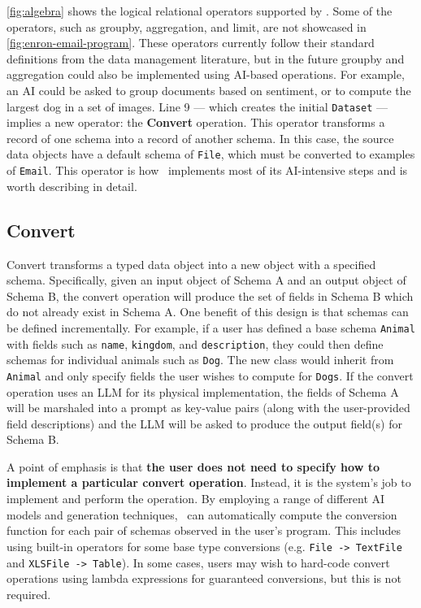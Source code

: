 \autoref{fig:algebra} shows the logical relational operators supported by \system{}.  Some of the operators, such as groupby, aggregation, and limit, are not showcased in \autoref{fig:enron-email-program}. These operators currently follow their standard definitions from the data management literature, but in the future groupby and aggregation could also be implemented using AI-based operations. For example, an AI could be asked to group documents based on sentiment, or to compute the largest dog in a set of images. Line 9 --- which creates the initial {\tt Dataset} --- implies a new operator: the \textbf{Convert} operation. This operator transforms a record of one schema into a record of another schema. In this case, the source data objects have a default schema of {\tt File}, which must be converted to examples of {\tt Email}. This operator is how \system\ implements most of its AI-intensive steps and is worth describing in detail.

\subsection{Convert}
\label{sec:convert}
Convert transforms a typed data object into a new object with a specified schema. Specifically, given an input object of Schema A and an output object of Schema B, the convert operation will produce the set of fields in Schema B which do not already exist in Schema A. One benefit of this design is that schemas can be defined incrementally. For example, if a user has defined a base schema \texttt{Animal} with fields such as \texttt{name}, \texttt{kingdom}, and \texttt{description}, they could then define schemas for individual animals such as \texttt{Dog}. The new class would inherit from \texttt{Animal} and only specify fields the user wishes to compute for \texttt{Dogs}. If the convert operation uses an LLM for its physical implementation, the fields of Schema A will be marshaled into a prompt as key-value pairs (along with the user-provided field descriptions) and the LLM will be asked to produce the output field(s) for Schema B.


A point of emphasis is that {\bf the user does not need to specify how to implement a particular convert operation}.  Instead, it is the system's job to implement and perform the operation. By employing a range of different AI models and generation techniques, \system\ can automatically compute the conversion function for each pair of schemas observed in the user's program. This includes using built-in operators for some base type conversions (e.g. \texttt{File -> TextFile} and \texttt{XLSFile -> Table}). In some cases, users may wish to hard-code convert operations using lambda expressions for guaranteed conversions, but this is not required.

